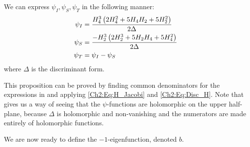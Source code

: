 \begin{boxproposition}\label{Ch4:Prop:psi_as_div_disc}
    We can express $\psi_I, \psi_S, \psi_T$ in the following manner:
    \begin{align}
        \psi_I &= \frac{H_4^3\left( 2 H_4^2 + 5 H_4 H_2 + 5 H_2^2 \right)}{2 \Delta}
            \label{Ch4:Eq:psi_I_def} \\
        \psi_S &= \frac{- H_2^3 \left( 2 H_2^3 + 5 H_2 H_4 + 5 H_4^2 \right)}{2 \Delta}
            \label{Ch4:Eq:psi_S_def} \\
        \psi_T &= \psi_I - \psi_S
            \label{Ch4:Eq:psi_T_def}
    \end{align}
    where $\Delta$ is the discriminant form.
\end{boxproposition}

This proposition can be proved by finding common denominators for the expressions in  and applying \eqref{Ch2:Eq:H_Jacobi} and \eqref{Ch2:Eq:Disc_H}. Note that  gives us a way of seeing that the $\psi$-functions are holomorphic on the upper half-plane, because $\Delta$ is holomorphic and non-vanishing and the numerators are made entirely of holomorphic functions.

We are now ready to define the $-1$-eigenfunction, denoted $b$.

